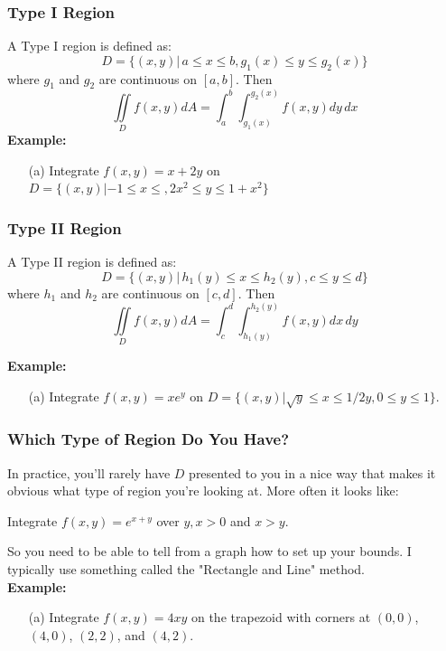 \documentclass{beamer}
\begin{document}
\begin{frame}
\frametitle{\textbf{Type I Region}}
A Type I region is defined as:
$$D = \{(x,y)| \,a \leq x \leq b, g_1(x) \leq y \leq g_2(x)\}$$
where $g_1$ and $g_2$ are continuous on $[a,b]$. Then
$$\iint\limits_{D} f(x,y)dA = \int_a^b \int_{g_1(x)}^{g_2(x)} f(x,y)dy\,dx$$
\vspace{12pt}
\textbf{Example:}
\begin{itemize}
	\item [(a)] Integrate $f(x,y) = x+2y$ on $D = \{(x,y)|-1\leq x \leq, 2x^2 \leq y \leq 1+x^2\}$
\end{itemize}
\end{frame}

\begin{frame}
\frametitle{\textbf{Type II Region}}
A Type II region is defined as:
$$D = \{(x,y)| \,h_1(y) \leq x \leq h_2(y), c \leq y \leq d\}$$
where $h_1$ and $h_2$ are continuous on $[c,d]$. Then
$$\iint\limits_{D} f(x,y)dA = \int_c^d \int_{h_1(y)}^{h_2(y)} f(x,y)dx\,dy$$
\vspace{12pt}

\textbf{Example:}

\begin{itemize}
	\item[(a)] Integrate $f(x,y) = xe^{y}$ on $D = \{(x,y)|\sqrt{y}\leq x \leq 1/2y, 0\leq y \leq 1 \}$.
\end{itemize}
\end{frame}

\begin{frame}
\frametitle{\textbf{Which Type of Region Do You Have?}}
In practice, you'll rarely have $D$  presented to you in a nice way that makes it obvious what type of region you're looking at. More often it looks like:\\
\vspace{12pt}
\begin{center}
	Integrate $f(x,y) = e^{x+y}$ over $y,x>0$ and $x>y$.
\end{center}
\vspace{12pt}
So you need to be able to tell from a graph how to set up your bounds. I typically use something called the "Rectangle and Line" method.\\
\vspace{12pt}
\textbf{Example:}
\begin{itemize}
	\item[(a)] Integrate $f(x,y) = 4xy$ on the trapezoid with corners at $(0,0)$, $(4,0)$, $(2,2)$, and $(4,2)$.
\end{itemize}
\end{frame}
\end{document}
